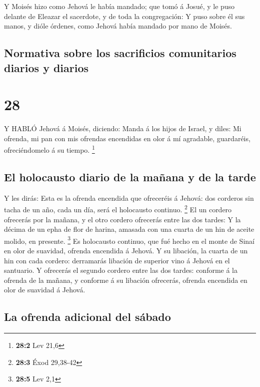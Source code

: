 Y Moisés hizo como Jehová le había mandado; que tomó á
Josué, y le puso delante de Eleazar el sacerdote, y de toda la
congregación:  Y puso sobre él sus manos, y dióle órdenes,
como Jehová había mandado por mano de Moisés.

\hypertarget{normativa-sobre-los-sacrificios-comunitarios-diarios-y-diarios}{%
\subsection{Normativa sobre los sacrificios comunitarios diarios y
diarios}\label{normativa-sobre-los-sacrificios-comunitarios-diarios-y-diarios}}

\hypertarget{section-27}{%
\section{28}\label{section-27}}

 Y HABLÓ Jehová á Moisés, diciendo:  Manda á los
hijos de Israel, y diles: Mi ofrenda, mi pan con mis ofrendas encendidas
en olor á mí agradable, guardaréis, ofreciéndomelo á su tiempo.
\footnote{\textbf{28:2} Lev 21,6}

\hypertarget{el-holocausto-diario-de-la-mauxf1ana-y-de-la-tarde}{%
\subsection{El holocausto diario de la mañana y de la
tarde}\label{el-holocausto-diario-de-la-mauxf1ana-y-de-la-tarde}}

 Y les dirás: Esta es la ofrenda encendida que ofreceréis á
Jehová: dos corderos sin tacha de un año, cada un día, será el
holocausto continuo. \footnote{\textbf{28:3} Éxod 29,38-42} 
El un cordero ofrecerás por la mañana, y el otro cordero ofrecerás entre
las dos tardes:  Y la décima de un epha de flor de harina,
amasada con una cuarta de un hin de aceite molido, en presente.
\footnote{\textbf{28:5} Lev 2,1}  Es holocausto continuo,
que fué hecho en el monte de Sinaí en olor de suavidad, ofrenda
encendida á Jehová.  Y su libación, la cuarta de un hin con
cada cordero: derramarás libación de superior vino á Jehová en el
santuario.  Y ofrecerás el segundo cordero entre las dos
tardes: conforme á la ofrenda de la mañana, y conforme á su libación
ofrecerás, ofrenda encendida en olor de suavidad á Jehová.

\hypertarget{la-ofrenda-adicional-del-suxe1bado}{%
\subsection{La ofrenda adicional del
sábado}\label{la-ofrenda-adicional-del-suxe1bado}}

